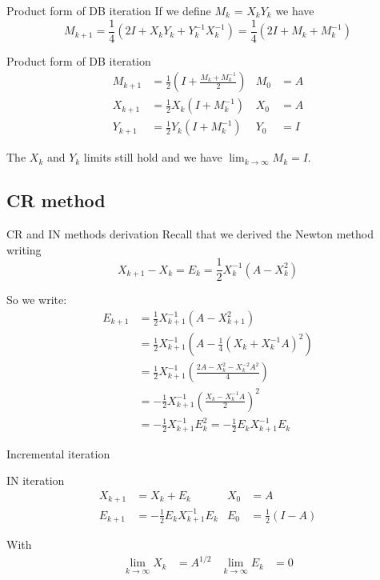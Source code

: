 \documentclass{beamer}
\theoremstyle{plain}
\theoremstyle{definition}
\theoremstyle{remark}
\newcommand{\pa}[1]{\left(#1\right)}
\begin{document}
\begin{frame}{Product form of DB iteration}
  If we define $M_k$ = $X_kY_k$ we have
  \[ M_{k+1} = \frac{1}{4}\pa{2 I + X_kY_k + Y_k^{-1}X_k^{-1}} =
    \frac{1}{4}\pa{2I + M_k + M_k^{-1}} \]
  \begin{block}{Product form of DB iteration}
    \begin{align*}
      M_{k+1} &= \frac{1}{2}\pa{ I + \frac{M_k + M_k^{-1}}{2}} & M_0 &=
                                                                      A
      \\
      X_{k+1} &= \frac{1}{2} X_k\pa{I+M_k^{-1}} & X_0 &= A \\
      Y_{k+1} &= \frac{1}{2} Y_k\pa{I+M_k^{-1}} & Y_0 &= I
    \end{align*}
  \end{block}
  The $X_k$ and $Y_k$ limits still hold and we have $\lim _{k\to
    \infty} M_k = I$.
\end{frame}

\subsection{CR method}

\begin{frame}{CR and IN methods derivation}
  Recall that we derived the Newton method writing
  \[ X_{k+1} - X_k = E_{k} = \frac{1}{2} X_k^{-1} \pa{A-X_k^2} \]
  
  So we write:
  \begin{align*}
    E_{k+1} &= \frac{1}{2}X_{k+1}^{-1}\pa{A-X_{k+1}^2} \\
    &= \frac{1}{2}X_{k+1}^{-1}\pa{A-\frac{1}{4}\pa{X_k +X_k^{-1}A}^2}
    \\
    &= \frac{1}{2}X_{k+1}^{-1}\pa{\frac{2A-X_k^2 -X_k^{-2}A^2}{4}} \\
    &= -\frac{1}{2}X_{k+1}^{-1}\pa{\frac{X_k - X_k^{-1}A}{2}}^2  \\
    &= -\frac{1}{2}X_{k+1}^{-1}E_k^2 = -\frac{1}{2}E_kX_{k+1}^{-1}E_k
  \end{align*}
\end{frame}

\begin{frame}{Incremental iteration}
  \begin{block}{IN iteration}
    \begin{align*}
      X_{k+1} &= X_k + E_k & X_0 &= A \\
      E_{k+1} &= -\frac{1}{2} E_k X_{k+1}^{-1} E_k & E_0
                                 &=\frac{1}{2}\pa{I-A}
    \end{align*}
  \end{block}
  With 
  \begin{align*}
    \lim _{k\to \infty} X_k & = A^{1/2} & \lim _{k\to \infty} E_k &=0
  \end{align*}
\end{frame}
\end{document}
